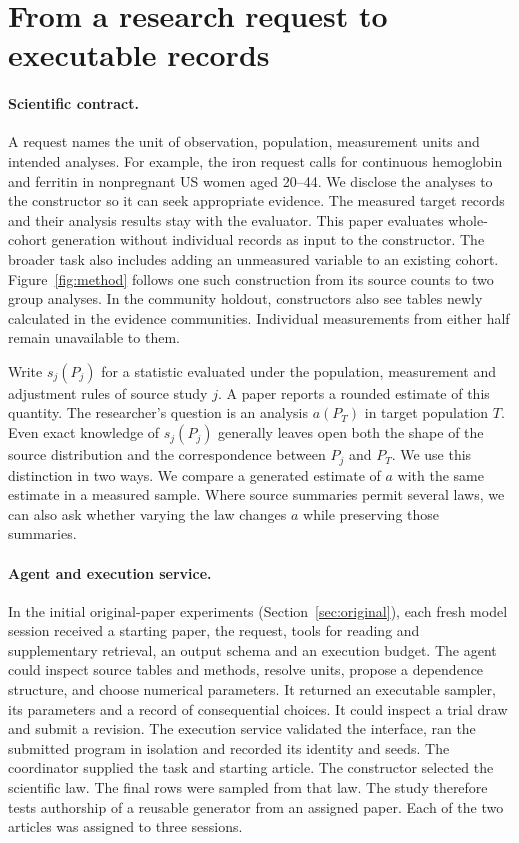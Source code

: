 \documentclass[sigconf,anonymous,review]{acmart}
\begin{document}
\section{From a research request to executable records}
\label{sec:method}

\paragraph{Scientific contract.}
A request names the unit of observation, population, measurement units and intended analyses. For example, the iron request calls for continuous hemoglobin and ferritin in nonpregnant US women aged 20--44. We disclose the analyses to the constructor so it can seek appropriate evidence. The measured target records and their analysis results stay with the evaluator. This paper evaluates whole-cohort generation without individual records as input to the constructor. The broader task also includes adding an unmeasured variable to an existing cohort. Figure~\ref{fig:method} follows one such construction from its source counts to two group analyses. In the community holdout, constructors also see tables newly calculated in the evidence communities. Individual measurements from either half remain unavailable to them.

Write $s_j(P_j)$ for a statistic evaluated under the population, measurement and adjustment rules of source study $j$. A paper reports a rounded estimate of this quantity. The researcher's question is an analysis $a(P_T)$ in target population $T$. Even exact knowledge of $s_j(P_j)$ generally leaves open both the shape of the source distribution and the correspondence between $P_j$ and $P_T$. We use this distinction in two ways. We compare a generated estimate of $a$ with the same estimate in a measured sample. Where source summaries permit several laws, we can also ask whether varying the law changes $a$ while preserving those summaries.

\paragraph{Agent and execution service.}
In the initial original-paper experiments (Section~\ref{sec:original}), each fresh model session received a starting paper, the request, tools for reading and supplementary retrieval, an output schema and an execution budget. The agent could inspect source tables and methods, resolve units, propose a dependence structure, and choose numerical parameters. It returned an executable sampler, its parameters and a record of consequential choices. It could inspect a trial draw and submit a revision. The execution service validated the interface, ran the submitted program in isolation and recorded its identity and seeds. The coordinator supplied the task and starting article. The constructor selected the scientific law. The final rows were sampled from that law. The study therefore tests authorship of a reusable generator from an assigned paper. Each of the two articles was assigned to three sessions.
\end{document}
